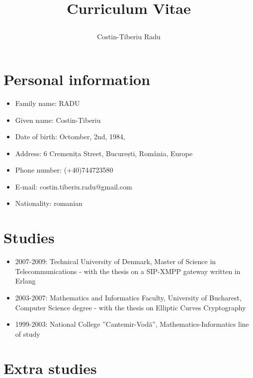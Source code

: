 \documentclass[a4paper,12pt,openany]{article}
\title{\begin{huge}Curriculum Vitae\end{huge}}
\author{\begin{large}Costin-Tiberiu Radu\end{large}}
\begin{document}
\maketitle
\section{Personal information}
	\begin{itemize}
 		\item Family name:	RADU
		\item Given name:	Costin-Tiberiu
		\item Date of birth:	Octomber, 2nd, 1984,
		\item Address:		6 Cremenița Street, București, România, Europe
		\item Phone number:	(+40)744723580
		\item E-mail:		costin.tiberiu.radu@gmail.com
		\item Nationality:	romanian
	\end{itemize}

\section{Studies}
	\begin{itemize}
		\item 2007-2009: Technical University of Denmark, Master of Science in Telecommunications - with the thesis on a SIP-XMPP gateway written in Erlang
		\item 2003-2007: Mathematics and Informatics Faculty, University of Bucharest, Computer Science degree - with the thesis on Elliptic Curves Cryptography
		\item 1999-2003: National College ”Cantemir-Vodă”, Mathematics-Informatics line of study
	\end{itemize}

\section{Extra studies}
\end{document}
